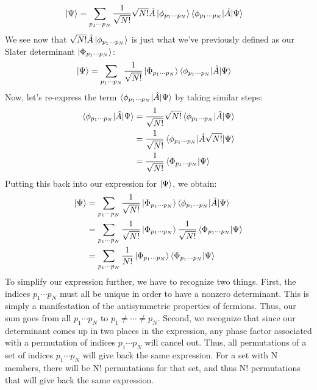 \documentclass{article}
\begin{document}
\begin{align*}
\ket{\Psi} &=\sum_{p_1 \cdots p_N}  \frac{1}{\sqrt{N!}} \sqrt{N!} \hat{A} \ket{\phi_{p_1 \cdots p_N}} \braket{\phi_{p_1 \cdots p_N} | \hat{A} | \Psi} 
\end{align*}
We see now that $\sqrt{N!} \hat{A} \ket{\phi_{p_1 \cdots p_N}}$ is just what we've previously defined as our Slater determinant $\ket{\Phi_{p_1 \cdots p_N}}$: 
\begin{align*}
\ket{\Psi} &=\sum_{p_1 \cdots p_N}  \frac{1}{\sqrt{N!}} \ket{\Phi_{p_1 \cdots p_N}} \braket{\phi_{p_1 \cdots p_N} | \hat{A} | \Psi} 
\end{align*}
Now, let's re-express the term $ \braket{\phi_{p_1 \cdots p_N} | \hat{A} | \Psi} $ by taking similar steps: 
\begin{align*}
\braket{\phi_{p_1 \cdots p_N} | \hat{A} | \Psi} &=  \frac{1}{\sqrt{N!}} {\sqrt{N!}} \braket{\phi_{p_1 \cdots p_N} | \hat{A} | \Psi}  \\
&=  \frac{1}{\sqrt{N!}}\braket{\phi_{p_1 \cdots p_N} | \hat{A}  {\sqrt{N!}}  | \Psi}  \\
&= \frac{1}{\sqrt{N!}}\braket{\Phi_{p_1 \cdots p_N} | \Psi}  
\end{align*}
Putting this back into our expression for $\ket{\Psi}$, we obtain: 
\begin{align*}
\ket{\Psi} &=\sum_{p_1 \cdots p_N}  \frac{1}{\sqrt{N!}} \ket{\Phi_{p_1 \cdots p_N}} \braket{\phi_{p_1 \cdots p_N} | \hat{A} | \Psi}  \\
 &=\sum_{p_1 \cdots p_N}  \frac{1}{\sqrt{N!}} \ket{\Phi_{p_1 \cdots p_N}}\frac{1}{\sqrt{N!}}\braket{\Phi_{p_1 \cdots p_N} | \Psi}   \\
&=\sum_{p_1 \cdots p_N}  \frac{1}{N!} \ket{\Phi_{p_1 \cdots p_N}}\braket{\Phi_{p_1 \cdots p_N} | \Psi}   \\
\end{align*}
To simplify our expression further, we have to recognize two things. 
First, the indices $p_1 \cdots p_N$ must all be unique in order to have a nonzero determinant. 
This is simply a manifestation of the antisymmetric properties of fermions. 
Thus, our sum goes from all $p_1 \cdots p_N$ to $p_1 \neq \cdots \neq p_N$. 
Second, we recognize that since our determinant comes up in two places in the expression, any phase factor associated with a permutation of indices $p_1 \cdots p_N$ will cancel out. 
Thus, all permutations of a set of indices $p_1 \cdots p_N$ will give back the same expression.
For a set with N members, there will be N! permutations for that set, and thus N! permutations that will give back the same expression.
\end{document}
